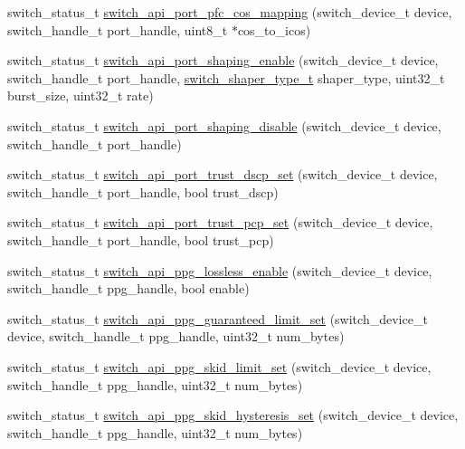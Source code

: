 \begin{DoxyCompactItemize}
\item 
switch\+\_\+status\+\_\+t \hyperlink{group__Port_ga39b531512e85981cb4e7f99318c3e063}{switch\+\_\+api\+\_\+port\+\_\+pfc\+\_\+cos\+\_\+mapping} (switch\+\_\+device\+\_\+t device, switch\+\_\+handle\+\_\+t port\+\_\+handle, uint8\+\_\+t $\ast$cos\+\_\+to\+\_\+icos)
\item 
switch\+\_\+status\+\_\+t \hyperlink{group__Port_ga6e6f45a9496d264af46b4e48d9a09d97}{switch\+\_\+api\+\_\+port\+\_\+shaping\+\_\+enable} (switch\+\_\+device\+\_\+t device, switch\+\_\+handle\+\_\+t port\+\_\+handle, \hyperlink{group__Meters_gaf0593a04026dacc8d7cf40c93b990bb5}{switch\+\_\+shaper\+\_\+type\+\_\+t} shaper\+\_\+type, uint32\+\_\+t burst\+\_\+size, uint32\+\_\+t rate)
\item 
switch\+\_\+status\+\_\+t \hyperlink{group__Port_ga349d90d8b9e613a7d2a23764d261c4b7}{switch\+\_\+api\+\_\+port\+\_\+shaping\+\_\+disable} (switch\+\_\+device\+\_\+t device, switch\+\_\+handle\+\_\+t port\+\_\+handle)
\item 
switch\+\_\+status\+\_\+t \hyperlink{group__Port_ga3f31b271310e845dd60834e009f98b73}{switch\+\_\+api\+\_\+port\+\_\+trust\+\_\+dscp\+\_\+set} (switch\+\_\+device\+\_\+t device, switch\+\_\+handle\+\_\+t port\+\_\+handle, bool trust\+\_\+dscp)
\item 
switch\+\_\+status\+\_\+t \hyperlink{group__Port_ga198111a47492d602a16fd096fcd8807a}{switch\+\_\+api\+\_\+port\+\_\+trust\+\_\+pcp\+\_\+set} (switch\+\_\+device\+\_\+t device, switch\+\_\+handle\+\_\+t port\+\_\+handle, bool trust\+\_\+pcp)
\item 
switch\+\_\+status\+\_\+t \hyperlink{group__Port_gad0189f9437a11a6c75fcdfd49fdaf444}{switch\+\_\+api\+\_\+ppg\+\_\+lossless\+\_\+enable} (switch\+\_\+device\+\_\+t device, switch\+\_\+handle\+\_\+t ppg\+\_\+handle, bool enable)
\item 
switch\+\_\+status\+\_\+t \hyperlink{group__Port_ga870eecc7306b30712441f5a81db26d81}{switch\+\_\+api\+\_\+ppg\+\_\+guaranteed\+\_\+limit\+\_\+set} (switch\+\_\+device\+\_\+t device, switch\+\_\+handle\+\_\+t ppg\+\_\+handle, uint32\+\_\+t num\+\_\+bytes)
\item 
switch\+\_\+status\+\_\+t \hyperlink{group__Port_ga5d92200852af4afe776553013791ac43}{switch\+\_\+api\+\_\+ppg\+\_\+skid\+\_\+limit\+\_\+set} (switch\+\_\+device\+\_\+t device, switch\+\_\+handle\+\_\+t ppg\+\_\+handle, uint32\+\_\+t num\+\_\+bytes)
\item 
switch\+\_\+status\+\_\+t \hyperlink{group__Port_gaf6855c2a5526e288e5641d6199ab5218}{switch\+\_\+api\+\_\+ppg\+\_\+skid\+\_\+hysteresis\+\_\+set} (switch\+\_\+device\+\_\+t device, switch\+\_\+handle\+\_\+t ppg\+\_\+handle, uint32\+\_\+t num\+\_\+bytes)

\end{DoxyCompactItemize}
